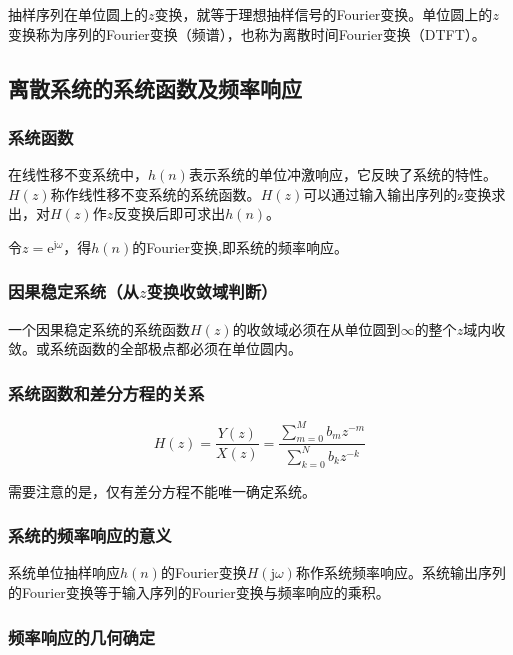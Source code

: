 \documentclass[cn, hazy, blue, normal, 12pt]{elegantnote}
\begin{document}
抽样序列在单位圆上的$z$变换，就等于理想抽样信号的Fourier变换。单位圆上的$z$变换称为序列的Fourier变换（频谱），也称为离散时间Fourier变换（DTFT）。

\subsection{离散系统的系统函数及频率响应}

\subsubsection{系统函数}

在线性移不变系统中，$h(n)$表示系统的单位冲激响应，它反映了系统的特性。$H(z)$称作线性移不变系统的系统函数。$H(z)$可以通过输入输出序列的z变换求出，对$H(z)$作$z$反变换后即可求出$h(n)$。

令$z=\text{e}^{\text{j}\omega}$，得$h(n)$的Fourier变换,即系统的频率响应。

\subsubsection{因果稳定系统（从$z$变换收敛域判断）}

一个因果稳定系统的系统函数$H(z)$的收敛域必须在从单位圆到$\infty$的整个$z$域内收敛。或系统函数的全部极点都必须在单位圆内。

\subsubsection{系统函数和差分方程的关系}

\begin{equation}
    H(z)=\frac{Y(z)}{X(z)}=\frac{\sum\limits_{m=0}^{M}{b_{m}z^{-m}}}{\sum\limits_{k=0}^{N}{b_{k}z^{-k}}}
\end{equation}

需要注意的是，仅有差分方程不能唯一确定系统。

\subsubsection{系统的频率响应的意义}

系统单位抽样响应$h(n)$的Fourier变换$H(\text{j}\omega)$称作系统频率响应。系统输出序列的Fourier变换等于输入序列的Fourier变换与频率响应的乘积。

\subsubsection{频率响应的几何确定}
\end{document}

